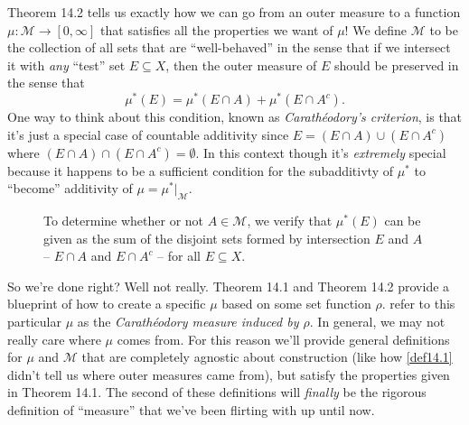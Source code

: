 \documentclass{article}
\theoremstyle{definition}
\begin{document}
Theorem 14.2 tells us exactly how we can go from an outer measure to a function $\mu:\mathcal M\to [0,\infty]$ that satisfies all the properties we want of $\mu$! We define $\mathcal M$ to be the collection of all sets that are ``well-behaved'' in the sense that if we intersect it with \textit{any} ``test'' set $E\subseteq X$, then the outer measure of $E$ should be preserved in the sense that 
$$  \mu^*(E) = \mu^*(E\cap A) + \mu^*(E\cap A^c) .$$ One way to think about this condition, known as \textit{\color{red}Carathéodory's criterion}, is that it's just a special case of countable additivity since $E = (E\cap A)\cup (E\cap A^c)$ where $(E\cap A)\cap (E\cap A^c)=\emptyset$. In this context though it's \textit{extremely} special because it happens to be a sufficient condition for the subadditivty of $\mu^*$ to ``become'' additivity of $\mu = \mu^*|_{\mathcal M}$.

	\begin{figure}[h!]
	\centering
	\caption{To determine whether or not $A\in\mathcal M$, we verify that $\mu^*(E)$ can be given as the sum of the disjoint sets formed by intersection $E$ and $A$ -- $E\cap A$ and $E\cap A^c$ -- for all $E\subseteq X$.} 
\end{figure}
 
 
 So we're done right? Well not really. Theorem 14.1 and Theorem 14.2 provide a blueprint of how to create a specific $\mu$ based on some set function $\rho$. \cite{royden1988real} refer to this particular $\mu$ as the \textit{\color{red}Carathéodory measure induced by $\rho$}. In general, we may not really care where $\mu$ comes from. For this reason we'll provide general definitions for $\mu$ and $\mathcal M$ that are completely agnostic about construction (like how \cref{def14.1} didn't tell us where outer measures came from), but satisfy the properties given in Theorem 14.1. The second of these definitions will \textit{finally} be the rigorous definition of ``measure'' that we've been flirting with up until now. 
 
\end{document}
